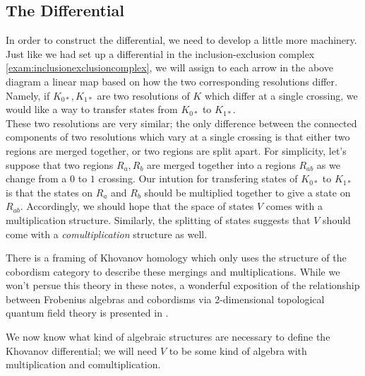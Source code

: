 \subsection{The Differential}
 In order to construct the differential, we need to develop a little more machinery. Just like we had set up a differential in the inclusion-exclusion complex \ref{exam:inclusionexclusioncomplex}, we will assign to each arrow in the above diagram a linear map based on how the two corresponding resolutions differ. Namely, if $K_{0*}, K_{1*}$ are two resolutions of $K$ which differ at a single crossing, we would like a way to transfer states from $K_{0*}$ to $K_{1*}$.\\
These two resolutions are very similar; the only difference between the connected components of two resolutions which vary at a single crossing is that either two regions are merged together, or two regions are split apart. For simplicity, let's suppose that two regions $R_a, R_b$ are merged together into a regions $R_{ab}$ as we change from a $0$ to $1$ crossing. Our intution for transfering states of $K_{0*}$ to $K_{1*}$ is that the states on $R_a$ and $R_b$ should be multiplied together to give a state on $R_{ab}$. Accordingly, we should hope that the space of states $V$ comes with a multiplication structure. Similarly, the splitting of states suggests that $V$ should come with a \emph{comultiplication} structure as well. \\
\begin{remark} There is a framing of Khovanov homology which only uses the structure of the cobordism category to describe these mergings and multiplications.  \project \label{proj:cobordism} While we won't persue this theory in these notes, a wonderful exposition of the relationship between Frobenius algebras and cobordisms via  2-dimensional topological quantum field theory is presented in \cite{kock2004frobenius}. 
\end{remark}
We now know what kind of algebraic structures are necessary to define the Khovanov differential; we will need $V$ to be some kind of algebra with multiplication and comultiplication. 
